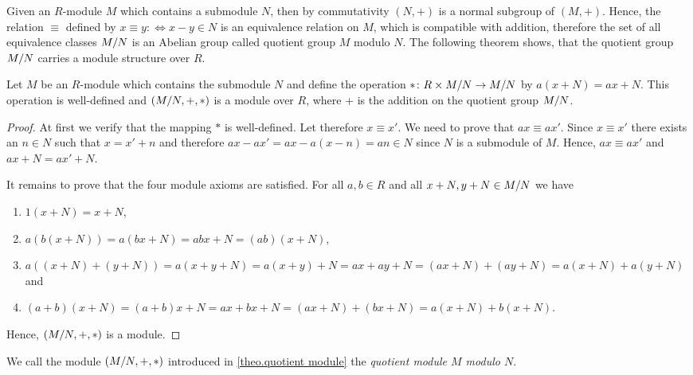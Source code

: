 Given an $R$-module $M$ which contains a submodule $N$, then by commutativity $(N,+)$ is a normal subgroup of $(M,+)$. Hence, the relation $\equiv$ defined by $x\equiv y:\Leftrightarrow x-y\in N$ is an equivalence relation on $M$, which is compatible with addition, therefore the set of all equivalence classes $M/N$ is an Abelian group called quotient group $M$ modulo $N$. The following theorem shows, that the quotient group $M/N$ carries a module structure over $R$.

\begin{thm} \label{theo.quotient module}
Let $M$ be an $R$-module which contains the submodule $N$ and define the operation $\ast\colon R\times M/N\rightarrow M/N$ by $a(x+N)=ax+N$. This operation is well-defined and $(M/N,+,\ast)$ is a module over $R$, where + is the addition on the quotient group $M/N$.
\end{thm}

\begin{proof}
At first we verify that the mapping $\ast$ is well-defined. Let therefore $x\equiv x'$. We need to prove that $ax\equiv ax'$. Since $x\equiv x'$ there exists an $n\in N$ such that $x=x'+n$ and therefore $ax-ax'=ax-a(x-n)=an\in N$ since $N$ is a submodule of $M$. Hence, $ax\equiv ax'$ and $ax+N=ax'+N$. 

It remains to prove that the four module axioms are satisfied. For all $a,b\in R$ and all $x+N,y+N\in M/N$ we have
\begin{enumerate}
\item $1(x+N)=x+N$,
\item $a(b(x+N))=a(bx+N)=abx+N=(ab)(x+N)$,
\item $a((x+N)+(y+N))=a(x+y+N)=a(x+y)+N=ax+ay+N=(ax+N)+(ay+N)=a(x+N)+a(y+N)$ and
\item $(a+b)(x+N)=(a+b)x+N=ax+bx+N=(ax+N)+(bx+N)=a(x+N)+b(x+N)$.
\end{enumerate}
Hence, $(M/N,+,\ast)$ is a module.
\end{proof}

\begin{defin}
We call the module $(M/N,+,\ast)$ introduced in \cref{theo.quotient module} the \emph{quotient module $M$ modulo $N$}.
\end{defin}

